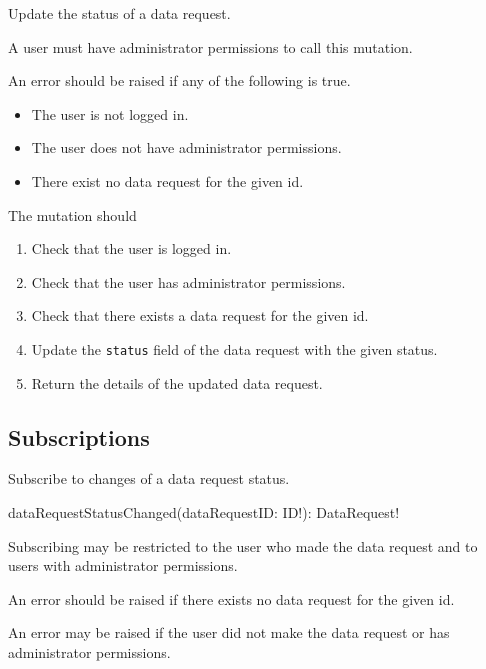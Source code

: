 Update the status of a data request.

\restrictions

A user must have administrator permissions to call this mutation.

\errors

An error should be raised if any of the following is true.

\begin{itemize}
    \item The user is not logged in.
    \item The user does not have administrator permissions.
    \item There exist no data request for the given id.
\end{itemize}

The mutation should

\begin{enumerate}
    \item Check that the user is logged in.
    \item Check that the user has administrator permissions.
    \item Check that there exists a data request for the given id.
    \item Update the \verb|status| field of the data request with the given status.
    \item Return the details of the updated data request.
\end{enumerate}

\subsection{Subscriptions}


Subscribe to changes of a data request status.

\begin{code}
dataRequestStatusChanged(dataRequestID: ID!): DataRequest!
\end{code}

\restrictions

Subscribing may be restricted to the user who made the data request and to users with administrator permissions.

\errors

An error should be raised if there exists no data request for the given id.

An error may be raised if the user did not make the data request or has administrator permissions.

